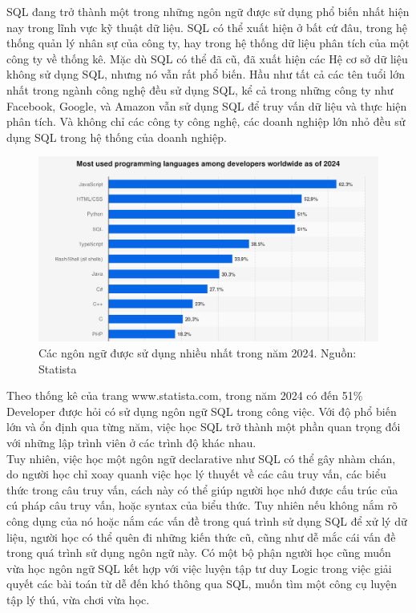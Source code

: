 \hspace*{1cm}SQL đang trở thành một trong những ngôn ngữ được sử dụng phổ biến nhất hiện nay trong lĩnh vực kỹ thuật dữ liệu. SQL có thể xuất hiện ở bất cứ đâu, trong hệ thống quản lý nhân sự của công ty, hay trong hệ thống dữ liệu phân tích của một công ty về thống kê. Mặc dù SQL có thể đã cũ, đã xuất hiện các Hệ cơ sở dữ liệu không sử dụng SQL, nhưng nó vẫn rất phổ biến. Hầu như tất cả các tên tuổi lớn nhất trong ngành công nghệ đều sử dụng SQL, kể cả trong những công ty như Facebook, Google, và Amazon vẫn sử dụng SQL để truy vấn dữ liệu và thực hiện phân tích. Và không chỉ các công ty công nghệ, các doanh nghiệp lớn nhỏ đều sử dụng SQL trong hệ thống của doanh nghiệp.\\
\begin{figure}[H]
	\centering
	\includegraphics[width=\textwidth]{Images/StatsMostLanguage.png}
	\vspace{0.5cm}
	\caption{Các ngôn ngữ được sử dụng nhiều nhất trong năm 2024. Nguồn: Statista}
\end{figure}


\hspace*{1cm}Theo thống kê của trang www.statista.com, trong năm 2024 có đến 51\% Developer được hỏi có sử dụng ngôn ngữ SQL trong công việc. Với độ phổ biến lớn và ổn định qua từng năm, việc học SQL trở thành một phần quan trọng đối với những lập trình viên ở các trình độ khác nhau.\\
Tuy nhiên, việc học một ngôn ngữ declarative như SQL có thể gây nhàm chán, do người học chỉ xoay quanh việc học lý thuyết về các câu truy vấn, các biểu thức trong câu truy vấn, cách này có thể giúp người học nhớ được cấu trúc của cú pháp câu truy vấn, hoặc syntax của biểu thức. Tuy nhiên nếu không nắm rõ công dụng của nó hoặc nắm các vấn đề trong quá trình sử dụng SQL để xử lý dữ liệu, người học có thể quên đi những kiến thức cũ, cũng như dễ mắc cái vấn đề trong quá trình sử dụng ngôn ngữ này. Có một bộ phận người học cũng muốn vừa học ngôn ngữ SQL kết hợp với việc luyện tập tư duy Logic trong việc giải quyết các bài toán từ dễ đến khó thông qua SQL, muốn tìm một công cụ luyện tập lý thú, vừa chơi vừa học.\\

